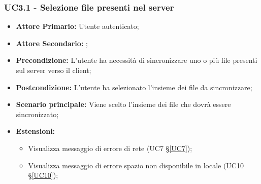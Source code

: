 \subsubsection{UC3.1 - Selezione file presenti nel server}
\begin{itemize}
\item \textbf{Attore Primario:} Utente autenticato;
\item \textbf{Attore Secondario:} ;
\item \textbf{Precondizione:} L'utente ha necessità di sincronizzare uno o più file presenti sul server verso il client;
\item \textbf{Postcondizione:} L'utente ha selezionato l'insieme dei file da sincronizzare;
\item \textbf{Scenario principale:} Viene scelto l'insieme dei file che dovrà essere sincronizzato;
\item \textbf{Estensioni:}
    \begin{itemize}
    \item Visualizza messaggio di errore di rete (UC7 \S{}\ref{UC7});
    \item Visualizza messaggio di errore spazio non disponibile in locale (UC10 \S{}\ref{UC10});
    \end{itemize}
\end{itemize}